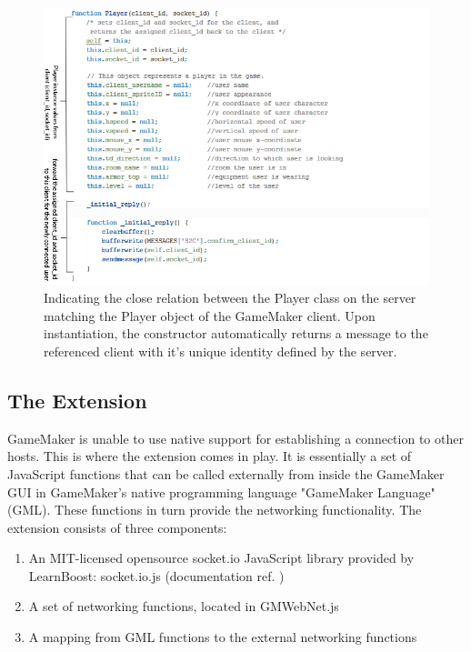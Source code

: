 \documentclass[bsc, 12pt, twoside, singlespacing, parskip, abbrevs, notimes, normalheadings, logo]{styles/infthesis}
\begin{document}
\begin{figure}
	\includegraphics[scale=0.75]{images/server_player_construct.jpg}
	\caption{Indicating the close relation between the Player class on the server matching the Player object of the GameMaker client. Upon instantiation, the constructor automatically returns a message to the referenced client with it's unique identity defined by the server.}
	\label{fig:server_player_construct}
	\vspace{1em}
\end{figure}

\subsection{The Extension}
GameMaker is unable to use native support for establishing a connection to other hosts. This is where the extension comes in play.
It is essentially a set of JavaScript functions that can be called externally from inside the GameMaker GUI in GameMaker's native programming language "GameMaker Language" (GML). These functions in turn provide the networking functionality.
The extension consists of three components:
\begin{enumerate}
\item An MIT-licensed opensource socket.io JavaScript library provided by LearnBoost: socket.io.js (documentation ref. \cite{socketiojs})
\item A set of networking functions, located in GMWebNet.js
\item A mapping from GML functions to the external networking functions
\end{enumerate}
\end{document}
